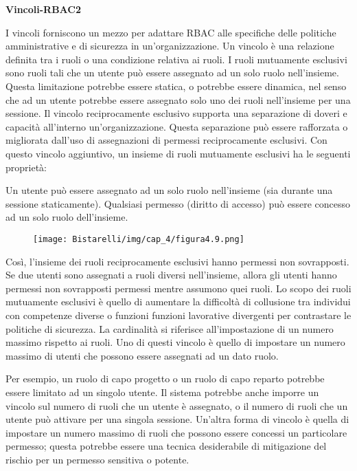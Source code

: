 \begin{center}
    \textbf{Vincoli-RBAC2}
\end{center}

I vincoli forniscono un mezzo per adattare RBAC alle specifiche delle politiche amministrative e di sicurezza in un'organizzazione. Un vincolo è una relazione definita tra i ruoli o una condizione relativa ai ruoli. I ruoli mutuamente esclusivi sono ruoli tali che un utente può essere assegnato ad un solo ruolo nell'insieme. Questa limitazione potrebbe essere statica, o potrebbe essere dinamica, nel senso che ad un utente potrebbe essere assegnato solo uno dei ruoli nell'insieme per una sessione. Il vincolo reciprocamente esclusivo supporta una separazione di doveri e capacità all'interno un'organizzazione. Questa separazione può essere rafforzata o migliorata dall'uso di assegnazioni di permessi reciprocamente esclusivi. Con questo vincolo aggiuntivo, un insieme di ruoli mutuamente esclusivi ha le seguenti proprietà:

\begin{center}
    Un utente può essere assegnato ad un solo ruolo nell'insieme (sia durante una sessione staticamente).
Qualsiasi permesso (diritto di accesso) può essere concesso ad un solo ruolo dell'insieme.
\end{center}

\begin{figure}[H]
	\centering
    \texttt{[image: Bistarelli/img/cap\_4/figura4.9.png]}
\end{figure}


\singlespacing

Così, l'insieme dei ruoli reciprocamente esclusivi hanno permessi non sovrapposti. Se due utenti sono assegnati a ruoli diversi nell'insieme, allora gli utenti hanno permessi non sovrapposti permessi mentre assumono quei ruoli. Lo scopo dei ruoli mutuamente esclusivi è quello di aumentare la difficoltà di collusione tra individui con competenze diverse o funzioni funzioni lavorative divergenti per contrastare le politiche di sicurezza. La cardinalità si riferisce all'impostazione di un numero massimo rispetto ai ruoli. Uno di questi vincolo è quello di impostare un numero massimo di utenti che possono essere assegnati ad un dato ruolo.

Per esempio, un ruolo di capo progetto o un ruolo di capo reparto potrebbe essere limitato ad un singolo utente. Il sistema potrebbe anche imporre un vincolo sul numero di ruoli che un utente è assegnato, o il numero di ruoli che un utente può attivare per una singola sessione. Un'altra forma di vincolo è quella di impostare un numero massimo di ruoli che possono essere concessi un particolare permesso; questa potrebbe essere una tecnica desiderabile di mitigazione del rischio per un permesso sensitiva o potente.

